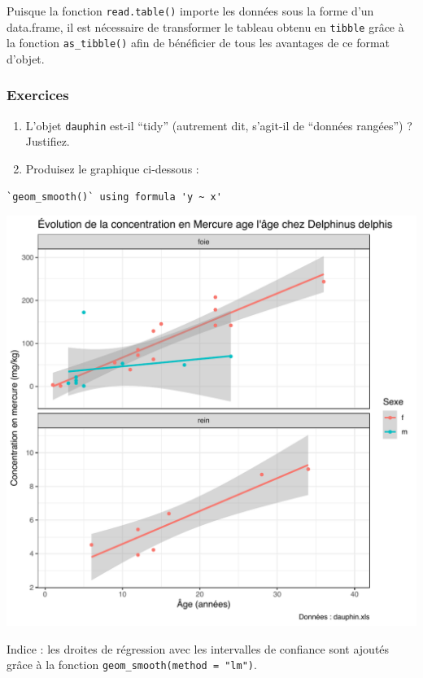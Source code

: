 \documentclass[
  a4paper,
]{article}
\providecommand{\tightlist}{%
  \setlength{\itemsep}{0pt}\setlength{\parskip}{0pt}}
\begin{document}
Puisque la fonction \texttt{read.table()} importe les données sous la forme d'un data.frame, il est nécessaire de transformer le tableau obtenu en \texttt{tibble} grâce à la fonction \texttt{as\_tibble()} afin de bénéficier de tous les avantages de ce format d'objet.

\hypertarget{exercices-8}{%
\subsubsection{Exercices}\label{exercices-8}}

\begin{enumerate}
\def\labelenumi{\arabic{enumi}.}
\tightlist
\item
  L'objet \texttt{dauphin} est-il ``tidy'' (autrement dit, s'agit-il de ``données rangées'') ? Justifiez.
\item
  Produisez le graphique ci-dessous :
\end{enumerate}

\begin{verbatim}
`geom_smooth()` using formula 'y ~ x'
\end{verbatim}

\begin{center}\includegraphics[width=0.9\linewidth]{figure/exercicedauphin-1} \end{center}

Indice : les droites de régression avec les intervalles de confiance sont ajoutés grâce à la fonction \texttt{geom\_smooth(method\ =\ "lm")}.
\end{document}
